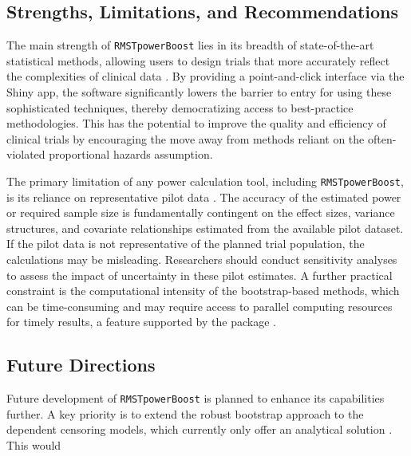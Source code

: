 \documentclass[article]{jss}
\begin{document}
\subsection{Strengths, Limitations, and Recommendations}
The main strength of \texttt{RMSTpowerBoost} lies in its breadth of state-of-the-art statistical methods, allowing users to design trials that more accurately reflect the complexities of clinical data \cite{[1]}. By providing a point-and-click interface via the Shiny app, the software significantly lowers the barrier to entry for using these sophisticated techniques, thereby democratizing access to best-practice methodologies. This has the potential to improve the quality and efficiency of clinical trials by encouraging the move away from methods reliant on the often-violated proportional hazards assumption.

The primary limitation of any power calculation tool, including \texttt{RMSTpowerBoost}, is its reliance on representative pilot data \cite{[1]}. The accuracy of the estimated power or required sample size is fundamentally contingent on the effect sizes, variance structures, and covariate relationships estimated from the available pilot dataset. If the pilot data is not representative of the planned trial population, the calculations may be misleading. Researchers should conduct sensitivity analyses to assess the impact of uncertainty in these pilot estimates. A further practical constraint is the computational intensity of the bootstrap-based methods, which can be time-consuming and may require access to parallel computing resources for timely results, a feature supported by the package \cite{[1]}.

\subsection{Future Directions}
Future development of \texttt{RMSTpowerBoost} is planned to enhance its capabilities further. A key priority is to extend the robust bootstrap approach to the dependent censoring models, which currently only offer an analytical solution \cite{[1]}. This would
\end{document}
